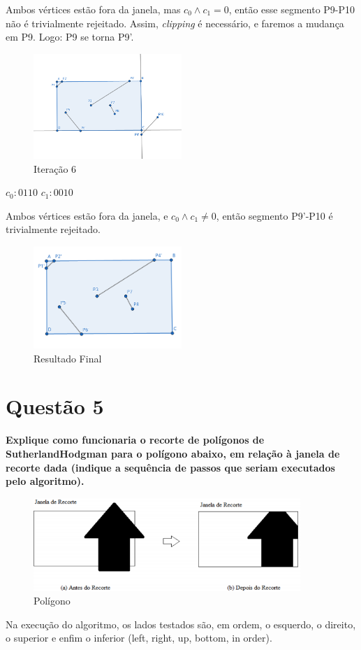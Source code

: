 \documentclass[12pt]{article}
\begin{document}
Ambos vértices estão fora da janela, mas $c_0 \land c_1 = 0$, então esse segmento P9-P10 não é trivialmente rejeitado. Assim, \textit{clipping} é necessário, e faremos a mudança em P9. Logo: P9 se torna P9'.

\begin{figure}[H]
    \centering
    \includegraphics[width=0.5\textwidth]{images/4/4it6.png}
    \caption*{Iteração 6}
\end{figure}\textbf{}

$c_0: 0110$ \hspace{1cm} $c_1: 0010$

Ambos vértices estão fora da janela, e $c_0 \land c_1 \ne 0$, então segmento P9'-P10 é trivialmente rejeitado.

\begin{figure}[H]
    \centering
    \includegraphics[width=0.5\textwidth]{images/4/4final.png}
    \caption*{Resultado Final}
\end{figure}

\section*{Questão 5}
{\bfseries Explique como funcionaria o recorte de polígonos de SutherlandHodgman para o polígono abaixo, em relação à janela de recorte dada (indique a sequência de passos que seriam executados pelo algoritmo).}

\begin{figure}[H]
    \centering
    \includegraphics[width=0.9\textwidth]{images/5/5.png}
    \caption{Polígono}
    \label{fig:5}
\end{figure}{}
Na execução do algoritmo, os lados testados são, em ordem, o esquerdo, o direito, o superior e enfim o inferior (left, right, up, bottom, in order).
\end{document}

